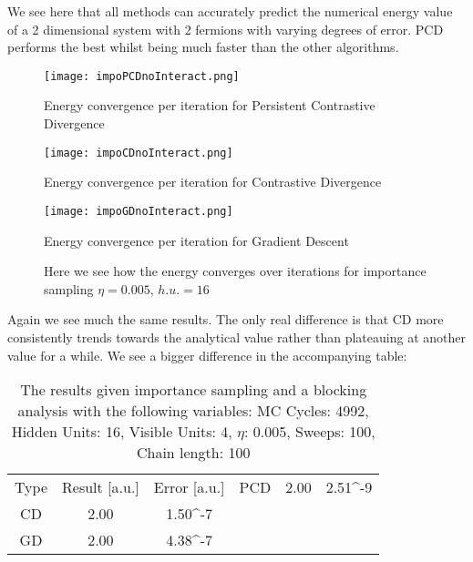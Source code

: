 \documentclass{article}
\begin{document}
\newline
We see here that all methods can accurately predict the numerical energy value of a 2 dimensional system with 2 fermions with varying degrees of error. PCD performs the best whilst being much faster than the other algorithms.
\begin{figure}[htbp]
  \centering
  \begin{minipage}[b]{0.3\textwidth}
    \texttt{[image: impoPCDnoInteract.png]}
    \caption{Energy convergence per iteration for Persistent Contrastive Divergence}
    \label{fig:figure2a}
  \end{minipage}
  \hfill
  \begin{minipage}[b]{0.3\textwidth}
    \texttt{[image: impoCDnoInteract.png]}
    \caption{Energy convergence per iteration for Contrastive Divergence}
    \label{fig:figure2b}
  \end{minipage}
  \hfill
  \begin{minipage}[b]{0.3\textwidth}
    \texttt{[image: impoGDnoInteract.png]}
    \caption{Energy convergence per iteration for Gradient Descent}
    \label{fig:figure2c}
  \end{minipage}
    \caption*{Here we see how the energy converges over iterations for importance sampling \newline
    $\eta = 0.005$, $h.u. = 16$}

\end{figure}
\newline
Again we see much the same results. The only real difference is that CD more consistently trends towards the analytical value rather than plateauing at another value for a while. \newline
We see a bigger difference in the accompanying table:
\begin{table}[ht!]
    \centering
    \begin{tabular}{c|c|c}
     Type& Result [a.u.]& Error [a.u.]&
     \hline
     PCD&  2.00& 2.51^{-9}\\
     CD& 2.00& 1.50^{-7}\\
     GD& 2.00& 4.38^{-7}
    \end{tabular}
    \caption{The results given importance sampling and a blocking analysis with the following variables:
    \newline MC Cycles: 4992, Hidden Units: 16, Visible Units: 4, $\eta$: 0.005, Sweeps: 100, Chain length: 100
    }
    \label{tab:impo}
\end{table}
\end{document}
